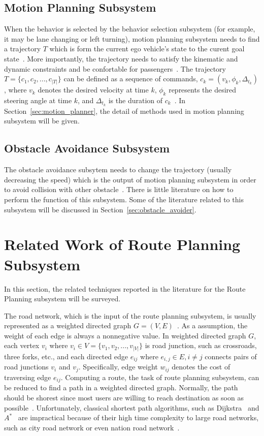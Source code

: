 \documentclass[conference]{IEEEtran}
\begin{document}
\subsection{Motion Planning Subsystem}
When the behavior is selected by the behavior selection subsystem (for example, it may be lane changing or left turning), motion planning subsystem needs to find a trajectory $T$ which is form the current ego vehicle's state to the curent goal state~\cite{Brian2016}. More importantly, the trajectory needs to satisfy the kinematic and dynamic constraints and be confortable for passengers~\cite{self_driving}. The trajectory $T=\{c_1, c_2, ..., c_{|T|}\}$ can be defined as a sequence of commands, $c_k=(v_k, \phi_k, \Delta_{t_k})$, where $v_k$ denotes the desired velocity at time $k$, $\phi_k$ represents the desired steering angle at time $k$, and $\Delta_{t_k}$ is the duration of $c_k$~\cite{self_driving}. In Section~\ref{sec:motion_planner}, the detail of methods used in motion planning subsystem will be given.

\subsection{Obstacle Avoidance Subsystem}
The obstacle avoidance subsytem needs to change the trajectory (usually decreasing the speed) which is the output of motion planning subsystem in order to avoid collision with other obstacle~\cite{self_driving}.  There is little literature on how to perform the function of this subsystem. Some of the literature related to this subsystem will be discussed in Section~\ref{sec:obstacle_avoider}.


\section{Related Work of Route Planning Subsystem}\label{sec:route_planner}
In this section, the related techniques reported in the literature for the Route Planning subsystem will be surveyed.

The road network, which is the input of the route planning subsystem, is usually represented as a weighted directed graph $G=(V, E)$~\cite{self_driving}. As a assumption, the weight of each edge is always a nonnegative value. In weighted directed graph $G$, each vertex $v_i$ where $v_i \in V=\{v_1, v_2, ..., v_{|V|}\}$ is road junction, such as crossroads, three forks, etc., and each directed edge $e_{ij}$ where $e_{i,j} \in E, i \neq j$ connects pairs of road junctions $v_i$ and $v_j$. Specifically, edge weight $w_{ij}$ denotes the cost of traversing edge $e_{ij}$. Computing a route, the task of route planning subsystem, can be reduced to find a path in a weighted directed graph. Normally, the path should be shorest since most users are willing to reach destination as soon as possible~\cite{self_driving}. Unfortunately, classical shortest path algorithms, such as Dijkstra~\cite{dijkstra1959note} and $A^*$~\cite{Hart1968formal} are impractical because of their high time complexity to large road networks, such as city road network or even nation road network~\cite{self_driving}.
\end{document}
